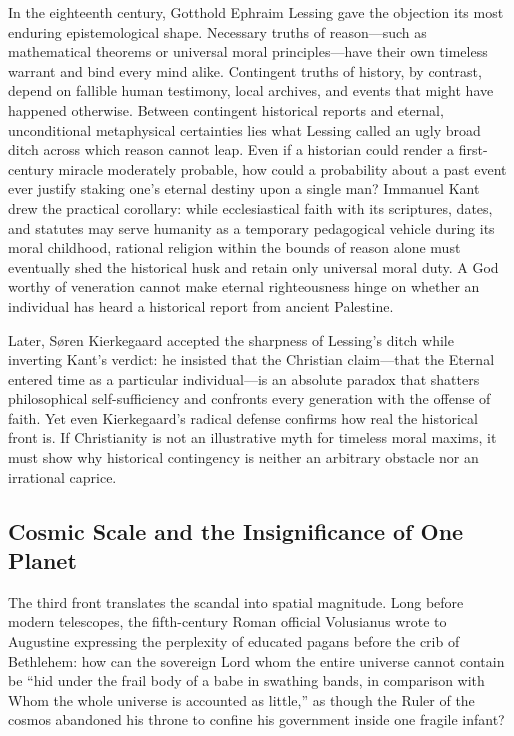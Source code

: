 In the eighteenth century, Gotthold Ephraim Lessing gave the objection its most enduring epistemological shape. Necessary truths of reason---such as mathematical theorems or universal moral principles---have their own timeless warrant and bind every mind alike. Contingent truths of history, by contrast, depend on fallible human testimony, local archives, and events that might have happened otherwise. Between contingent historical reports and eternal, unconditional metaphysical certainties lies what Lessing called an ugly broad ditch across which reason cannot leap. Even if a historian could render a first-century miracle moderately probable, how could a probability about a past event ever justify staking one's eternal destiny upon a single man? Immanuel Kant drew the practical corollary: while ecclesiastical faith with its scriptures, dates, and statutes may serve humanity as a temporary pedagogical vehicle during its moral childhood, rational religion within the bounds of reason alone must eventually shed the historical husk and retain only universal moral duty. A God worthy of veneration cannot make eternal righteousness hinge on whether an individual has heard a historical report from ancient Palestine.

Later, S\o ren Kierkegaard accepted the sharpness of Lessing's ditch while inverting Kant's verdict: he insisted that the Christian claim---that the Eternal entered time as a particular individual---is an absolute paradox that shatters philosophical self-sufficiency and confronts every generation with the offense of faith. Yet even Kierkegaard's radical defense confirms how real the historical front is. If Christianity is not an illustrative myth for timeless moral maxims, it must show why historical contingency is neither an arbitrary obstacle nor an irrational caprice.

\subsection{Cosmic Scale and the Insignificance of One Planet}

The third front translates the scandal into spatial magnitude. Long before modern telescopes, the fifth-century Roman official Volusianus wrote to Augustine expressing the perplexity of educated pagans before the crib of Bethlehem: how can the sovereign Lord whom the entire universe cannot contain be ``hid under the frail body of a babe in swathing bands, in comparison with Whom the whole universe is accounted as little,'' as though the Ruler of the cosmos abandoned his throne to confine his government inside one fragile infant?

